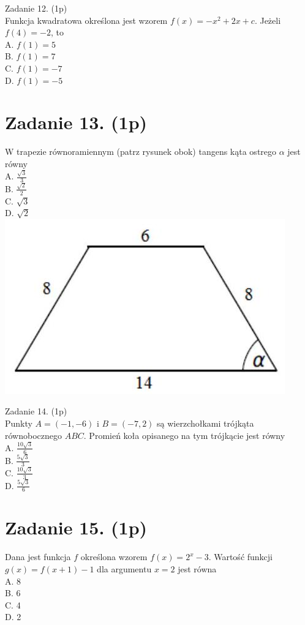 \documentclass[10pt]{article}
\begin{document}
Zadanie 12. (1p)\\
Funkcja kwadratowa określona jest wzorem \(f(x)=-x^{2}+2 x+c\). Jeżeli \(f(4)=-2\), to\\
A. \(f(1)=5\)\\
B. \(f(1)=7\)\\
C. \(f(1)=-7\)\\
D. \(f(1)=-5\)

\section*{Zadanie 13. (1p)}
W trapezie równoramiennym (patrz rysunek obok) tangens kąta ostrego \(\alpha\) jest równy\\
A. \(\frac{\sqrt{3}}{3}\)\\
B. \(\frac{\sqrt{2}}{2}\)\\
C. \(\sqrt{3}\)\\
D. \(\sqrt{2}\)\\
\includegraphics[max width=\textwidth, center]{2024_11_21_0213a2175f3206eefc55g-04(1)}

Zadanie 14. (1p)\\
Punkty \(A=(-1,-6)\) i \(B=(-7,2)\) są wierzchołkami trójkąta równobocznego \(A B C\). Promień koła opisanego na tym trójkącie jest równy\\
A. \(\frac{10 \sqrt{3}}{6}\)\\
B. \(\frac{5 \sqrt{3}}{3}\)\\
C. \(\frac{10 \sqrt{3}}{3}\)\\
D. \(\frac{5 \sqrt{3}}{6}\)

\section*{Zadanie 15. (1p)}
Dana jest funkcja \(f\) określona wzorem \(f(x)=2^{x}-3\). Wartość funkcji \(g(x)=f(x+1)-1\) dla argumentu \(x=2\) jest równa\\
A. 8\\
B. 6\\
C. 4\\
D. 2
\end{document}
